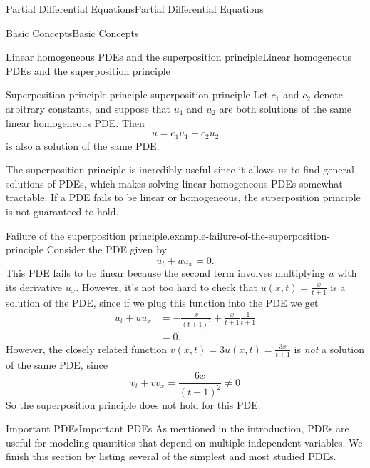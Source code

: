 \documentclass[10pt,]{book}
\numberwithin{equation}{section}
\begin{document}
\begin{chapterptx}{Partial Differential Equations}{}{Partial Differential Equations}{}{}
\begin{sectionptx}{Basic Concepts}{}{Basic Concepts}{}{}
\begin{subsectionptx}{Linear homogeneous PDEs and the superposition principle}{}{Linear homogeneous PDEs and the superposition principle}{}{}
\begin{principle}{Superposition principle.}{}{principle-superposition-principle}
\hypertarget{p-446}{}%
Let \(c_{1}\) and \(c_{2}\) denote arbitrary constants, and suppose that \(u_{1}\) and \(u_{2}\) are both solutions of the same linear homogeneous PDE. Then%
\begin{equation*}
u = c_{1}u_{1}+c_{2}u_{2}
\end{equation*}
is also a solution of the same PDE.%
\end{principle}
\hypertarget{p-447}{}%
The superposition principle is incredibly useful since it allows us to find general solutions of PDEs, which makes solving linear homogeneous PDEs somewhat tractable. If a PDE fails to be linear or homogeneous, the superposition principle is not guaranteed to hold.%
\begin{example}{Failure of the superposition principle.}{example-failure-of-the-superposition-principle}%
\hypertarget{p-448}{}%
Consider the PDE given by%
\begin{equation*}
u_{t}+uu_{x} = 0.
\end{equation*}
This PDE fails to be linear because the second term involves multiplying \(u\) with its derivative \(u_{x}\). However, it's not too hard to check that \(u(x,t) = \frac{x}{t+1}\) is a solution of the PDE, since if we plug this function into the PDE we get%
\begin{align*}
u_{t} + uu_{x} & = -\frac{x}{(t+1)^{2}} + \frac{x}{t+1}\frac{1}{t+1} \\
& = 0. 
\end{align*}
However, the closely related function \(v(x,t) = 3u(x,t) = \frac{3x}{t+1}\) is \emph{not} a solution of the same PDE, since%
\begin{equation*}
v_{t}+vv_{x} = \frac{6x}{(t+1)^{2}}\neq0
\end{equation*}
So the superposition principle does not hold for this PDE.%
\end{example}
\end{subsectionptx}
%
%
\typeout{************************************************}
\typeout{************************************************}
%
\begin{subsectionptx}{Important PDEs}{}{Important PDEs}{}{}\label{subsection-important-pdes}
\hypertarget{p-449}{}%
As mentioned in the introduction, PDEs are useful for modeling quantities that depend on multiple independent variables. We finish this section by listing several of the simplest and most studied PDEs.%
\leavevmode%
\begin{enumerate}

\end{enumerate}
\end{subsectionptx}
\end{sectionptx}
\end{chapterptx}
\end{document}
